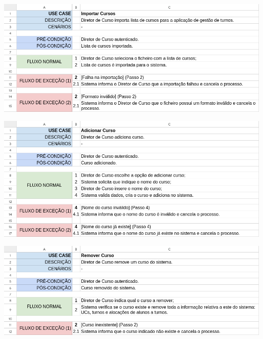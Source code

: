 \documentclass[a4paper,12pt]{scrreprt}
\begin{document}
\begin{minipage}{\textwidth}
    \centering
    \includegraphics[width=1\textwidth]{images/use-cases/descriptions/23-Importar Cursos.png}
    \label{fig:3-23-importar_cursos}
\end{minipage}

\begin{minipage}{\textwidth}
    \centering
    \includegraphics[width=1\textwidth]{images/use-cases/descriptions/24-Adicionar Curso.png}
    \label{fig:3-24-adicionar_curso}
\end{minipage}

\begin{minipage}{\textwidth}
    \centering
    \includegraphics[width=1\textwidth]{images/use-cases/descriptions/25-Remover Curso.png}
    \label{fig:3-25-remover_curso}
\end{minipage}
\end{document}
